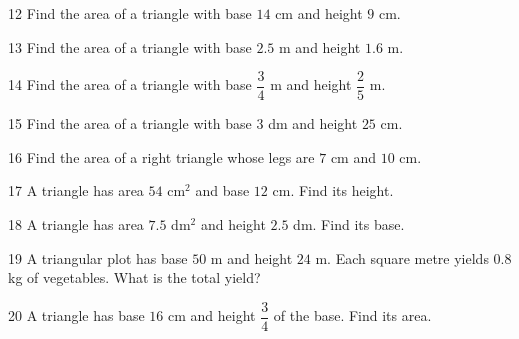 \gap
\begin{probbox}{12}{\relax}
Find the area of a triangle with base $14$ cm and height $9$ cm.
\end{probbox}
\gap
\begin{probbox}{13}{\relax}
Find the area of a triangle with base $2.5$ m and height $1.6$ m.
\end{probbox}
\gap
\begin{probbox}{14}{\relax}
Find the area of a triangle with base $\dfrac34$ m and height $\dfrac25$ m.
\end{probbox}
\gap
\begin{probbox}{15}{\relax}
Find the area of a triangle with base $3$ dm and height $25$ cm.
\end{probbox}
\gap
\begin{probbox}{16}{\relax}
Find the area of a right triangle whose legs are $7$ cm and $10$ cm.
\end{probbox}
\gap
\begin{probbox}{17}{\relax}
A triangle has area $54$ cm$^2$ and base $12$ cm. Find its height.
\end{probbox}
\gap
\begin{probbox}{18}{\relax}
A triangle has area $7.5$ dm$^2$ and height $2.5$ dm. Find its base.
\end{probbox}
\gap
\begin{probbox}{19}{\relax}
A triangular plot has base $50$ m and height $24$ m. Each square metre yields $0.8$ kg of vegetables. What is the total yield?
\end{probbox}
\gap
\begin{probbox}{20}{\relax}
A triangle has base $16$ cm and height $\dfrac34$ of the base. Find its area.
\end{probbox}
